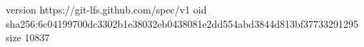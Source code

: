 version https://git-lfs.github.com/spec/v1
oid sha256:6c04199700dc3302b1e38032eb0438081e2dd554abd3844d813bf37733291295
size 10837
